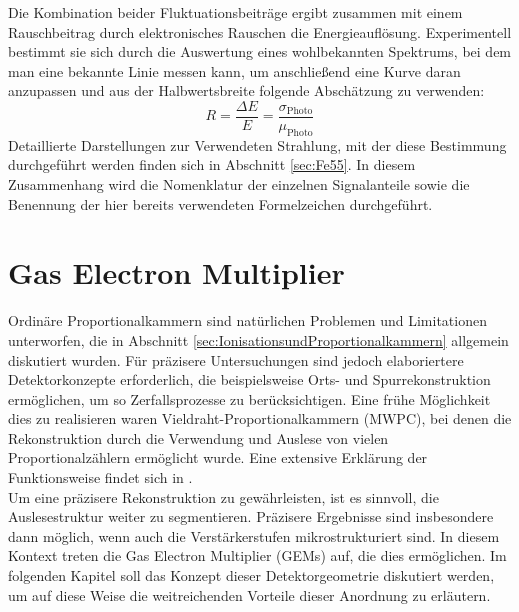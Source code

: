 			Die Kombination beider Fluktuationsbeiträge ergibt zusammen mit einem Rauschbeitrag durch elektronisches Rauschen die Energieauflösung. Experimentell bestimmt sie sich durch die Auswertung eines wohlbekannten Spektrums, bei dem man eine bekannte Linie messen kann, um anschließend eine Kurve daran anzupassen und aus der Halbwertsbreite folgende Abschätzung zu verwenden:
				\begin{equation*}
					R=\frac{\Delta E}{E}= \frac{\sigma_{{\text{Photo}}}}{\mu_{\text{Photo}}}
				\end{equation*}
			Detaillierte Darstellungen zur Verwendeten Strahlung, mit der diese Bestimmung durchgeführt werden finden sich in Abschnitt  \ref{sec:Fe55}. In diesem Zusammenhang wird die Nomenklatur der einzelnen Signalanteile sowie die Benennung der hier bereits verwendeten Formelzeichen durchgeführt.
			
			

\chapter{Gas Electron Multiplier}
Ordinäre Proportionalkammern sind natürlichen Problemen und Limitationen unterworfen, die in Abschnitt \ref{sec:IonisationsundProportionalkammern} allgemein diskutiert wurden. Für präzisere Untersuchungen sind jedoch elaboriertere Detektorkonzepte erforderlich, die beispielsweise Orts- und Spurrekonstruktion ermöglichen, um so Zerfallsprozesse zu berücksichtigen. Eine frühe Möglichkeit dies zu realisieren waren Vieldraht-Proportionalkammern (MWPC), bei denen die Rekonstruktion durch die Verwendung und Auslese von vielen Proportionalzählern ermöglicht wurde. Eine extensive Erklärung der Funktionsweise findet sich in \cite{Sauli_Multiwire}.\\
Um eine präzisere Rekonstruktion zu gewährleisten, ist es sinnvoll, die Auslesestruktur weiter zu segmentieren. Präzisere Ergebnisse sind insbesondere dann möglich, wenn auch die Verstärkerstufen mikrostrukturiert sind. In diesem Kontext treten die Gas Electron Multiplier (GEMs) auf, die dies ermöglichen. Im folgenden Kapitel soll das Konzept dieser Detektorgeometrie diskutiert werden, um auf diese Weise die weitreichenden Vorteile dieser Anordnung zu erläutern.

